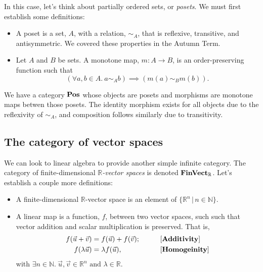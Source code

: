 \documentclass[10pt,a4paper,reqno]{amsart}
\numberwithin{figure}{section}
\begin{document}
In this case, let's think about partially ordered sets, or \emph{posets}. We
must first establish
some definitions:
\begin{itemize}
        \item A poset is a set, $A$, with a relation, $\sim_A$, that is
                reflexive, transitive, and antisymmetric. We covered these properties in
                the Autumn Term.
        \item Let $A$ and $B$ be sets. A monotone map, $m \colon A \to B$, is an
                order-preserving function such that
                \begin{equation*}
                        ( \forall a, b \in A. \  a \sim_A b )
                        \implies ( m(a) \sim_B m(b) ).
                \end{equation*}
\end{itemize}
We have a category $\operatorname{\mathbf{Pos}}$ whose objects are posets and morphisms are monotone
maps betwen those posets. The identity morphism exists for all objects due to
the reflexivity of $\sim_A$, and composition follows similarly due to
transitivity.

\subsection{The category of vector spaces}
We can look to linear algebra to provide another simple infinite category. The
category of finite-dimensional $\mathbb{R}$\emph{-vector spaces} is denoted
$\operatorname{\mathbf{FinVect}_\mathbb{R}}$. Let's establish a couple more definitions:
\begin{itemize}
        \item A finite-dimensional $\mathbb{R}$-vector space is an element of
$               \{ \mathbb{R} ^n \, | \, n \in \mathbb{N} \}$.
        \item A linear map is a function, $f$, between two vector spaces, such
                such that vector addition and scalar multiplication is
                preserved. That is,
                \begin{alignat*}{2}
                        f(\vec{u}+\vec{v}) &= f(\vec{u})+f(\vec{v});
                        \qquad && \text{[\textbf{Additivity}]} \\
                        f(\lambda\vec{u}) &= \lambda f(\vec{u}),
                        \qquad && \text{[\textbf{Homogeinity}]}
                \end{alignat*}
                with $\exists n \in \mathbb{N}. \  \vec{u},\vec{v}\in \mathbb{R} ^n
                \text{ and } \lambda \in \mathbb{R}$.
\end{itemize}
\end{document}
